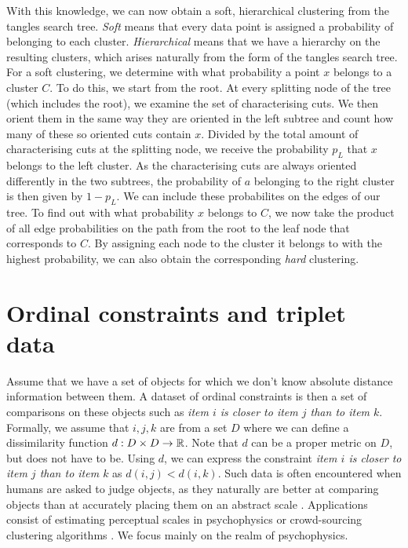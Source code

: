With this knowledge, we can now obtain a soft, hierarchical clustering from the tangles search tree. 
\textit{Soft} means that every data point is assigned
a probability of belonging to each cluster. 
\textit{Hierarchical} means that we have a hierarchy on the resulting clusters, which arises naturally
from the form of the tangles search tree. 
For a soft clustering, we determine with what probability a point $x$ belongs to a cluster $C$. 
To do this, we start from the root. At every splitting node of the tree (which includes the root), we examine the set of characterising cuts.
We then orient them in the same way they are oriented in the left subtree and count how many of these so oriented cuts contain $x$. Divided by the total amount of characterising cuts at the
splitting node, we receive the probability $p_L$ that $x$ belongs to the left cluster. As the characterising cuts are always oriented differently in the two subtrees, the probability
of $a$ belonging to the right cluster is then given by $1 - p_L$. We can include these probabilites on the edges of our tree. 
To find out with what probability $x$ belongs to $C$, 
we now take the product of all edge probabilities on the path from the root to the leaf node that corresponds to $C$. 
By assigning each node to the cluster it belongs to with the highest probability, we can also obtain the corresponding \textit{hard} clustering.

\section{Ordinal constraints and triplet data}
Assume that we have a set of objects for which we don't know absolute distance information
between them. 
A dataset of ordinal constraints is then a set of comparisons on these
objects such as \textit{item $i$ is closer to item $j$ than to item $k$}. 
Formally, we assume that $i, j, k$ are from 
a set $D$ where we can define a dissimilarity function $d: D \times D \to \mathbb{R}$. Note that $d$ can be a proper metric on $D$, but does not have to be.
Using $d$, we can express the constraint \textit{item $i$ is closer to item $j$ than to item $k$} 
as $d(i, j) < d(i, k)$. Such data is often encountered when humans are asked to judge objects, 
as they naturally are better at comparing objects
than at accurately placing them on an abstract scale \citep{demiralpLearningPerceptualKernels2014}. 
Applications consist of estimating perceptual scales in psychophysics 
\citep{haghiriEstimationPerceptualScales2020} or crowd-sourcing clustering algorithms \citep{ukkonenCrowdsourcedCorrelationClustering2017}. 
We focus mainly on the realm of psychophysics.

